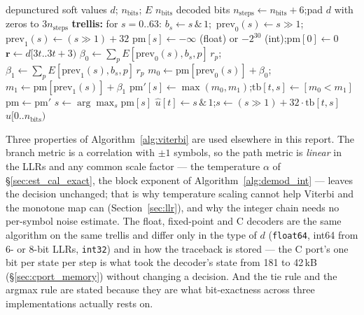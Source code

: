 \begin{algorithm}[H]
\caption{Soft-decision Viterbi (float, fixed-point and C).}
\label{alg:viterbi}
\begin{algorithmic}[1]
\Require depunctured soft values $d$; $n_{\mathrm{bits}}$; $E$
\Ensure $n_{\mathrm{bits}}$ decoded bits
\State $n_{\mathrm{steps}} \gets n_{\mathrm{bits}} + 6$;\quad pad $d$ with zeros to $3 n_{\mathrm{steps}}$
\State \textbf{trellis:} for $s = 0..63$: $b_s \gets s \,\&\, 1$;\ $\mathrm{prev}_0(s) \gets s \gg 1$;\ $\mathrm{prev}_1(s) \gets (s \gg 1) + 32$ 
\State $\mathrm{pm}[s] \gets -\infty$ (float) or $-2^{30}$ (int);\quad $\mathrm{pm}[0] \gets 0$ 
 
    \State $\mathbf{r} \gets d[3t .. 3t{+}3)$
        \State $\beta_0 \gets \sum_p E[\mathrm{prev}_0(s), b_s, p]\, r_p$;\quad $\beta_1 \gets \sum_p E[\mathrm{prev}_1(s), b_s, p]\, r_p$ 
        \State $m_0 \gets \mathrm{pm}[\mathrm{prev}_0(s)] + \beta_0$;\quad $m_1 \gets \mathrm{pm}[\mathrm{prev}_1(s)] + \beta_1$
        \State $\mathrm{pm}'[s] \gets \max(m_0, m_1)$;\quad $\mathrm{tb}[t, s] \gets [m_0 < m_1]$ 
    \EndFor
    \State $\mathrm{pm} \gets \mathrm{pm}'$ 
\EndFor
\State $s \gets \arg\max_s \mathrm{pm}[s]$ 
 
    \State $\hat u[t] \gets s \,\&\, 1$;\quad $s \gets (s \gg 1) + 32 \cdot \mathrm{tb}[t, s]$
\EndFor
\State \Return $\hat u[0..n_{\mathrm{bits}})$
\end{algorithmic}
\end{algorithm}

Three properties of Algorithm~\ref{alg:viterbi} are used elsewhere in
this report.  The branch metric is a correlation with $\pm 1$ symbols,
so the path metric is \emph{linear} in the LLRs and any common scale
factor --- the temperature $\alpha$ of \S\ref{sec:est_cal_exact}, the
block exponent of Algorithm~\ref{alg:demod_int} --- leaves the decision
unchanged; that is why temperature scaling cannot help Viterbi and the
monotone map can (Section~\ref{sec:llr}), and why the integer chain
needs no per-symbol noise estimate.  The float, fixed-point and C
decoders are the same algorithm on the same trellis and differ only
in the type of $d$ (\texttt{float64}, int64 from 6- or 8-bit LLRs,
\texttt{int32}) and in how the traceback is stored --- the C port's
one bit per state per step is what took the decoder's state from 181
to 42\,kB (\S\ref{sec:cport_memory}) without changing a decision.
And the tie rule and the argmax rule are stated because they are what
bit-exactness across three implementations actually rests on.

